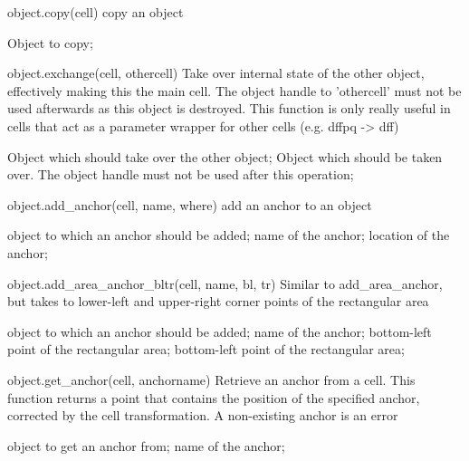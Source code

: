 \begin{APIfunc}{object.copy(cell)}
    copy an object
    \begin{APIparameters}
            Object to copy;
    \end{APIparameters}
\end{APIfunc}
\begin{APIfunc}{object.exchange(cell, othercell)}
    Take over internal state of the other object, effectively making this the main cell. The object handle to 'othercell' must not be used afterwards as this object is destroyed. This function is only really useful in cells that act as a parameter wrapper for other cells (e.g. dffpq -> dff)
    \begin{APIparameters}
            Object which should take over the other object;
            Object which should be taken over. The object handle must not be used after this operation;
    \end{APIparameters}
\end{APIfunc}
\begin{APIfunc}{object.add\_anchor(cell, name, where)}
    add an anchor to an object
    \begin{APIparameters}
            object to which an anchor should be added;
            name of the anchor;
            location of the anchor;
    \end{APIparameters}
\end{APIfunc}
\begin{APIfunc}{object.add\_area\_anchor\_bltr(cell, name, bl, tr)}
    Similar to add\_area\_anchor, but takes to lower-left and upper-right corner points of the rectangular area
    \begin{APIparameters}
            object to which an anchor should be added;
            name of the anchor;
            bottom-left point of the rectangular area;
            bottom-left point of the rectangular area;
    \end{APIparameters}
\end{APIfunc}
\begin{APIfunc}{object.get\_anchor(cell, anchorname)}
    Retrieve an anchor from a cell. This function returns a point that contains the position of the specified anchor, corrected by the cell transformation. A non-existing anchor is an error
    \begin{APIparameters}
            object to get an anchor from;
            name of the anchor;
    \end{APIparameters}
\end{APIfunc}

